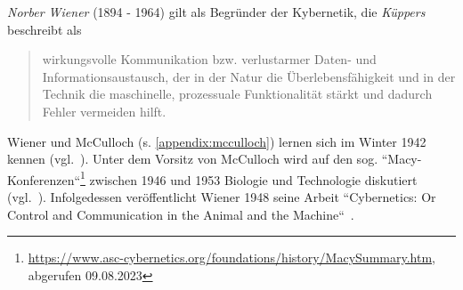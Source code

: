 \textit{Norber Wiener} (1894 - 1964) gilt als Begründer der Kybernetik, die \textit{Küppers} beschreibt als

\blockquote[{\cite[2]{Kup19}}]{
    wirkungsvolle Kommunikation bzw. verlustarmer Daten- und Informationsaustausch, der in der Natur die Überlebensfähigkeit und in der Technik die maschinelle, prozessuale Funktionalität stärkt und dadurch Fehler vermeiden hilft.
}

Wiener und McCulloch (s. \ref{appendix:mcculloch}) lernen sich im Winter 1942 kennen (vgl.~\cite[218]{Mas90}).
Unter dem Vorsitz von McCulloch wird auf den sog. ``Macy-Konferenzen``\footnote{
    \url{https://www.asc-cybernetics.org/foundations/history/MacySummary.htm}, abgerufen 09.08.2023
} zwischen 1946 und 1953 Biologie und Technologie diskutiert (vgl.~\cite[5]{Arb19}).
Infolgedessen veröffentlicht Wiener 1948 seine Arbeit ``Cybernetics: Or Control and Communication in the Animal and the Machine``~\cite{Wie48}.